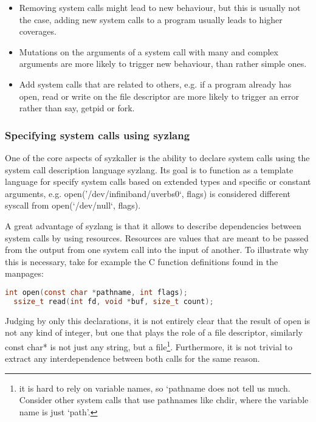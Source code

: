 \begin{itemize}
  \item Removing system calls might lead to new behaviour, but this is usually not the case, adding new system calls to a program usually leads to higher coverages.
  \item Mutations on the arguments of a  system call with many and complex arguments are more likely to trigger new behaviour, than rather simple ones.
  \item Add system calls that are related to others, e.g. if a program already has open, read or write on the file descriptor are more likely to trigger an error rather than say, getpid or fork.
\end{itemize}

\subsubsection{Specifying system calls using syzlang}


One of the core aspects of syzkaller is the ability to declare system calls using
the system call description language syzlang. Its goal is to function as a template
language for specify system calls based on extended types and specific or constant arguments,
e.g. open('/dev/infiniband/uverbs0`, flags) is considered different syscall from open(`/dev/null`, flags).

A great advantage of syzlang is
that it allows to describe dependencies between system calls by using resources.
Resources are values that are meant to be passed from the output from one system call
into the input of another.
To illustrate why this is necessary, take for example the C function definitions found in the manpages:

\begin{lstlisting}[caption={Manpage C definitions for open and read}, language=c]
  int open(const char *pathname, int flags);
  ssize_t read(int fd, void *buf, size_t count);
\end{lstlisting}

Judging by only this declarations, it is not entirely clear that the result of open
is not any kind of integer, but one that plays the role of a file descriptor, similarly const char* is not
just any string, but a file\footnote{it is hard to rely on variable names, so `pathname does not tell us much. Consider other system calls that use pathnames like chdir, where the variable name is just `path'.}. Furthermore,
it is not trivial to extract any interdependence between both calls for the same reason.

